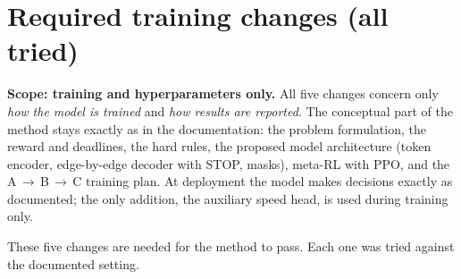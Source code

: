 \documentclass[10pt,a4paper]{article}
\begin{document}
\section{Required training changes (all tried)}\label{sec:changes}
\begin{goodbox}
\textbf{Scope: training and hyperparameters only.} All five changes concern only \emph{how the model is trained} and \emph{how results are reported}. The conceptual part of the method stays exactly as in the documentation: the problem formulation, the reward and deadlines, the hard rules, the proposed model architecture (token encoder, edge-by-edge decoder with STOP, masks), meta-RL with PPO, and the A\,$\to$\,B\,$\to$\,C training plan. At deployment the model makes decisions exactly as documented; the only addition, the auxiliary speed head, is used during training only.
\end{goodbox}
These five changes are needed for the method to pass. Each one was tried against the documented setting.
\end{document}
